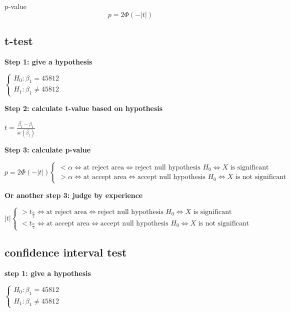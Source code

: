 \documentclass{article}
\begin{document}
p-value
\begin{equation}
  p=2 \Phi(-|t|)
\end{equation}


\subsection{t-test} %
\label{sub:t_test}


\textbf{Step 1: give a hypothesis}

$\begin{cases}
  H_0: \beta_1  = 45812
  \\
  H_1: \beta_1 \neq 45812
\end{cases}$


\textbf{Step 2: calculate t-value based on hypothesis}

$t=\frac{\hat{\beta_{1}}-\beta_{1}}{se(\hat{\beta_{1}})}$

\textbf{Step 3:  calculate p-value}

$p=2 \Phi(-|t|) 
\begin{cases}
  < \alpha \iff \text{at reject area} \iff \text{reject null hypothesis $H_0$} \iff \text{$X$ is significant}
  \\
  > \alpha \iff \text{at accept area} \iff \text{accept null hypothesis $H_0$} \iff \text{$X$ is not significant}
\end{cases}$

\textbf{Or another step 3:  judge by experience}

$|t|
\begin{cases}
>t_{\frac{\alpha}{2}} \iff \text{at reject area} \iff \text{reject null hypothesis $H_0$} \iff \text{$X$ is significant}
\\
<t_{\frac{\alpha}{2}} \iff \text{at accept area} \iff \text{accept null hypothesis $H_0$} \iff \text{$X$ is not significant}
\end{cases}$


\subsection{confidence interval test} %
\label{subp:confidence_interval_test}

\textbf{step 1: give a hypothesis}

$\begin{cases}
  H_0: \beta_1  = 45812
  \\
  H_1: \beta_1 \neq 45812
\end{cases}$
\end{document}
